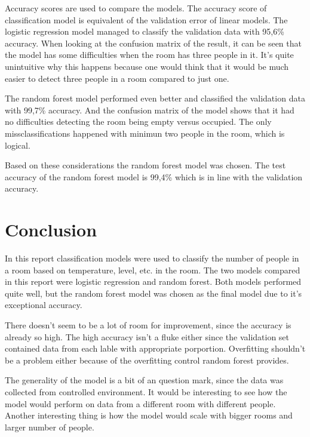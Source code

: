 \documentclass[11pt]{article}
\begin{document}
Accuracy scores are used to compare the models.
The accuracy score of classification model is equivalent of the validation error of linear models.
The logistic regression model managed to classify the validation data with 95,6\% accuracy.
When looking at the confusion matrix of the result, it can be seen that the model has some difficulties when the room has three people in it.
It's quite unintuitive why this happens because one would think that it would be much easier to detect three people in a room compared to just one.

The random forest model performed even better and classified the validation data with 99,7\% accuracy.
And the confusion matrix of the model shows that it had no difficulties detecting the room being empty versus occupied.
The only missclassifications happened with minimun two people in the room, which is logical.

Based on these considerations the random forest model was chosen.
The test accuracy of the random forest model is 99,4\% which is in line with the validation accuracy.

\section{Conclusion}

In this report classification models were used to classify the number of people in a room based on temperature,  level, etc. in the room. 
The two models compared in this report were logistic regression and random forest.
Both models performed quite well, but the random forest model was chosen as the final model due to it's exceptional accuracy.

There doesn't seem to be a lot of room for improvement, since the accuracy is already so high. 
The high accuracy isn't a fluke either since the validation set contained data from each lable with appropriate porportion.
Overfitting shouldn't be a problem either because of the overfitting control random forest provides.

The generality of the model is a bit of an question mark, since the data was collected from controlled environment.
It would be interesting to see how the model would perform on data from a different room with different people.
Another interesting thing is how the model would scale with bigger rooms and larger number of people.

\printbibliography

\appendix

\end{document}
